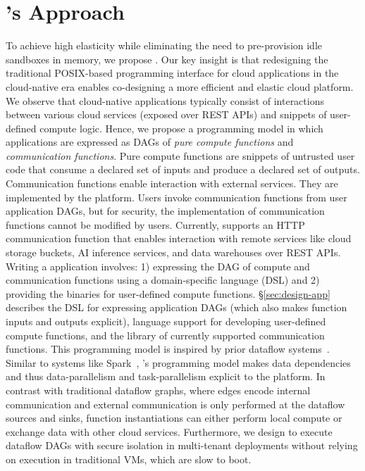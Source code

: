 \section{\dandelion's Approach}

To achieve high elasticity while eliminating the need to pre-provision idle sandboxes in memory, we propose \dandelion.
Our key insight is that redesigning the traditional POSIX-based programming interface for cloud applications in the cloud-native era enables co-designing a more efficient and elastic cloud platform. We observe that cloud-native applications typically consist of interactions between various cloud services (exposed over REST APIs) and snippets of user-defined compute logic. Hence, we propose a programming model in which applications are expressed as DAGs of \textit{pure compute functions} and \textit{communication functions}.
Pure compute functions are snippets of untrusted user code that consume a declared set of inputs and produce a declared set of outputs.
Communication functions enable interaction with external services.
They are implemented by the \dandelion platform. Users invoke communication functions from user application DAGs, but for security, the implementation of communication functions cannot be modified by users. Currently, \dandelion supports an HTTP communication function that enables interaction with remote services like cloud storage buckets, AI inference services, and data warehouses over REST APIs.  
Writing a \dandelion application involves: 1) expressing the DAG of compute and communication functions using a domain-specific language (DSL) and 2) providing the binaries for user-defined compute functions. \S\ref{sec:design-app} describes the DSL for expressing application DAGs (which also makes function inputs and outputs explicit),  language support for developing user-defined compute functions, and the library of currently supported communication functions.
This programming model is inspired by prior dataflow systems~\cite{spark, beam, naiad, dryad, dryadLINQ, malte-dataflow}. Similar to systems like Spark~\cite{spark}, \dandelion's programming model makes data dependencies and thus data-parallelism and task-parallelism explicit to the platform. In contrast with traditional dataflow graphs, where edges encode internal communication and external communication is only performed at the dataflow sources and sinks, \dandelion function instantiations can either perform local compute or exchange data with other cloud services. Furthermore, we design \dandelion to execute dataflow DAGs with secure isolation in multi-tenant deployments without relying on execution in traditional VMs, which are slow to boot.

